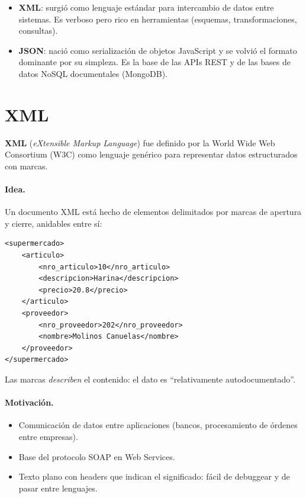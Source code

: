 \documentclass[11pt,a4paper]{article}
\begin{document}
\begin{itemize}
    \item \textbf{XML}: surgió como lenguaje estándar para intercambio
    de datos entre sistemas. Es verboso pero rico en herramientas
    (esquemas, transformaciones, consultas).
    \item \textbf{JSON}: nació como serialización de objetos JavaScript
    y se volvió el formato dominante por su simpleza. Es la base de las
    APIs REST y de las bases de datos NoSQL documentales (MongoDB).
\end{itemize}

\section{XML}

\textbf{XML} (\emph{eXtensible Markup Language}) fue definido por la
World Wide Web Consortium (W3C) como lenguaje genérico para representar
datos estructurados con marcas.

\paragraph{Idea.} Un documento XML está hecho de elementos delimitados
por marcas de apertura y cierre, anidables entre sí:

\begin{lstlisting}
<supermercado>
    <articulo>
        <nro_articulo>10</nro_articulo>
        <descripcion>Harina</descripcion>
        <precio>20.8</precio>
    </articulo>
    <proveedor>
        <nro_proveedor>202</nro_proveedor>
        <nombre>Molinos Canuelas</nombre>
    </proveedor>
</supermercado>
\end{lstlisting}

Las marcas \emph{describen} el contenido: el dato es ``relativamente
autodocumentado''.

\paragraph{Motivación.}
\begin{itemize}
    \item Comunicación de datos entre aplicaciones (bancos,
    procesamiento de órdenes entre empresas).
    \item Base del protocolo SOAP en Web Services.
    \item Texto plano con headers que indican el significado: fácil de
    debuggear y de pasar entre lenguajes.
\end{itemize}
\end{document}
